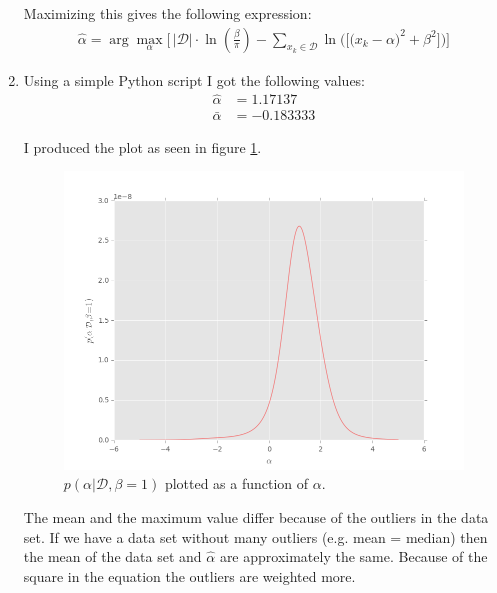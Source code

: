 \documentclass[paper=a4, fontsize=10pt]{scrartcl} %
\numberwithin{equation}{section} %
\numberwithin{figure}{section} %
\numberwithin{table}{section} %
\begin{document}
\begin{enumerate}
			Maximizing this gives the following expression:
			\begin{align}
				\hat \alpha = \arg\max_\alpha \bigg[ \, \vert \mathcal{D} \vert \cdot \ln(\frac{\beta}{\pi}) - \sum_{x_k \in \mathcal{D}} \ln\big(\big[\big(x_k - \alpha\big)^2 + \beta^2\big]\big) \bigg]
			\end{align}
	\item
			Using a simple Python script I got the following values:
				\begin{align}
					\hat\alpha &= 1.17137\\
					\bar\alpha &= -0.183333
				\end{align}

			I produced the plot as seen in figure \ref{distr_all}.

			\begin{figure}[H]
				\centering
				\includegraphics[scale=0.55]{exercise_214.png}
				\caption{$p(\alpha \vert \mathcal{D}, \beta = 1)$ plotted as a function of $\alpha$.}
				\label{distr_all}
			\end{figure}

			The mean and the maximum value differ because of the outliers in the data set. If we have a data set without many outliers (e.g. mean = median) then the mean of the data set and $\hat\alpha$ are approximately the same. Because of the square in the equation the outliers are weighted more.
\end{enumerate}
\end{document}
